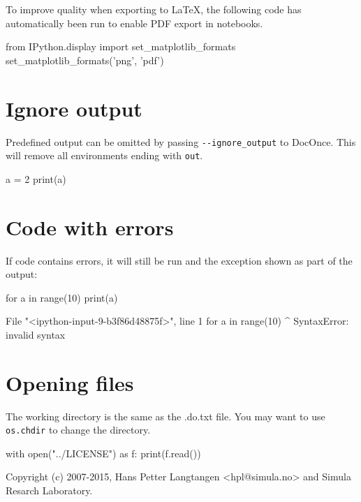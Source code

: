 \documentclass[%
oneside,                 %
final,                   %
chapterprefix=true,      %
open=right,              %
10pt]{book}
\begin{document}
To improve quality when exporting to {\LaTeX}, the following code has automatically
been run to enable PDF export in notebooks.




\bpycod
from IPython.display import set_matplotlib_formats
set_matplotlib_formats('png', 'pdf')

\epycod


\section{Ignore output}

Predefined output can be omitted by passing \Verb!--ignore_output! to DocOnce.
This will remove all environments ending with \texttt{out}.




\bpycod
a = 2
print(a)

\epycod

\epyout




\epy

\epyout

\section{Code with errors}

If code contains errors, it will still be run and the exception shown as part
of the output:




\bpycod
for a in range(10)
    print(a)

\epycod

\bpyout
  File "<ipython-input-9-b3f86d48875f>", line 1
    for a in range(10)
                      ^
SyntaxError: invalid syntax
\epyout

\section{Opening files}

The working directory is the same as the .do.txt file.
You may want to use \texttt{os.chdir} to change the directory.




\bpycod
with open("../LICENSE") as f:
    print(f.read())

\epycod

\bpyout
Copyright (c) 2007-2015, Hans Petter Langtangen <hpl@simula.no> and
Simula Resarch Laboratory.
\end{document}

